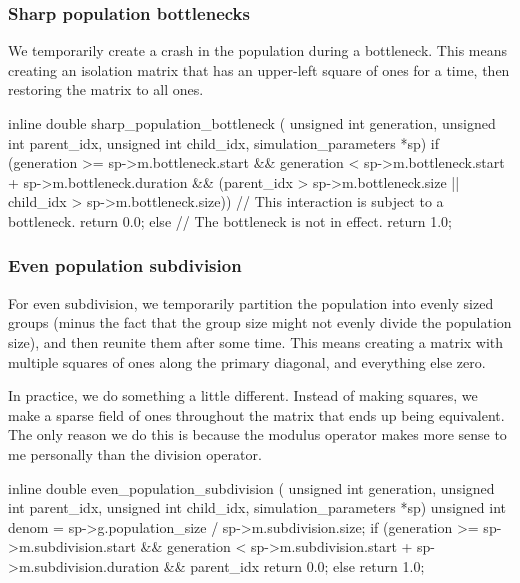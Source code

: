 \documentclass{article}
\begin{document}
      \subsubsection{Sharp population bottlenecks}

	We temporarily create a crash in the population during a bottleneck.
	This means creating an isolation matrix that has an upper-left square of
	ones for a time, then restoring the matrix to all ones.

\begin{ccode}
inline double sharp_population_bottleneck (
    unsigned int generation, unsigned int parent_idx,
    unsigned int child_idx, simulation_parameters *sp) {
  if (generation >= sp->m.bottleneck.start &&
      generation < sp->m.bottleneck.start + sp->m.bottleneck.duration &&
      (parent_idx > sp->m.bottleneck.size ||
       child_idx > sp->m.bottleneck.size))
    // This interaction is subject to a bottleneck.
    return 0.0;
  else
    // The bottleneck is not in effect.
    return 1.0;
}
\end{ccode}

      \subsubsection{Even population subdivision}

	For even subdivision, we temporarily partition the population into
	evenly sized groups (minus the fact that the group size might not evenly
	divide the population size), and then reunite them after some time.
	This means creating a matrix with multiple squares of ones along the
	primary diagonal, and everything else zero.

	In practice, we do something a little different. Instead of making
	squares, we make a sparse field of ones throughout the matrix that ends
	up being equivalent. The only reason we do this is because the modulus
	operator makes more sense to me personally than the division operator.

\begin{ccode}
inline double even_population_subdivision (
    unsigned int generation, unsigned int parent_idx,
    unsigned int child_idx, simulation_parameters *sp) {
  unsigned int denom = sp->g.population_size / sp->m.subdivision.size;
  if (generation >= sp->m.subdivision.start &&
      generation < sp->m.subdivision.start + sp->m.subdivision.duration &&
      parent_idx %
    return 0.0;
  else
    return 1.0;
}
\end{ccode}
\end{document}

